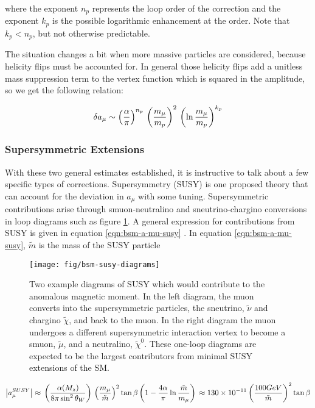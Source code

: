 \noindent
where the exponent $n_p$ represents the loop order of the correction and the exponent $k_p$ is the possible logarithmic enhancement at the order.  Note that $k_p < n_p$, but not otherwise predictable.

The situation changes a bit when more massive particles are considered, because helicity flips must be accounted for.  In general those helicity flips add a unitless mass suppression term to the vertex function which is squared in the amplitude, so we get the following relation:

\begin{equation}
\label{eqn:bsm-general-large-m}
\delta a_\mu \sim \left(\frac{\alpha}{\pi}\right)^{n_p} \\
\left(\frac{m_\mu}{m_p}\right)^2 \\
\left(\ln{\frac{m_\mu}{m_p}} \right)^{k_p}
\end{equation}

\subsubsection{Supersymmetric Extensions}
With these two general estimates established, it is instructive to talk about a few specific types of corrections.  Supersymmetry (SUSY) is one proposed theory that can account for the deviation in $a_\mu$ with some tuning.  Supersymmetric contributions arise through smuon-neutralino and sneutrino-chargino conversions in loop diagrams such as figure \ref{fig:bsm-susy-diagrams}.  A general expression for contributions from SUSY is given in equation \ref{eqn:bsm-a-mu-susy} \cite{a-mu-harbinger}.  In equation \ref{eqn:bsm-a-mu-susy}, $\tilde{m}$ is the mass of the SUSY particle

\begin{figure}
\centering
\texttt{[image: fig/bsm-susy-diagrams]}
\caption{Two example diagrams of SUSY which would contribute to the anomalous magnetic moment. In the left diagram, the muon converts into the supersymmetric particles, the sneutrino, $\tilde{\nu}$ and chargino $\tilde{\chi}$, and back to the muon.  In the right diagram the muon undergoes a different supersymmetric interaction vertex to become a smuon, $\tilde{\mu}$, and a neutralino, $\tilde{\chi}^0$.  These one-loop diagrams are expected to be the largest contributors from minimal SUSY extensions of the SM. \label{fig:bsm-susy-diagrams}}
\end{figure}

\begin{equation}
\label{eqn:bsm-a-mu-susy}
\left|a_\mu^{SUSY}\right| \approx \\
\left(\frac{\alpha(M_z)}{8 \pi \sin^2{\theta_W}} \right) \\
\left( \frac{m_\mu}{\tilde{m}} \right)^2 \tan{\beta} \\
\left(1 - \frac{4\alpha}{\pi}\ln{\frac{\tilde{m}}{m_\mu}} \right) \\
\approx 130 \times 10^{-11} \\
\left(\frac{100 GeV}{\tilde{m}} \right)^2 \tan{\beta}
\end{equation}


